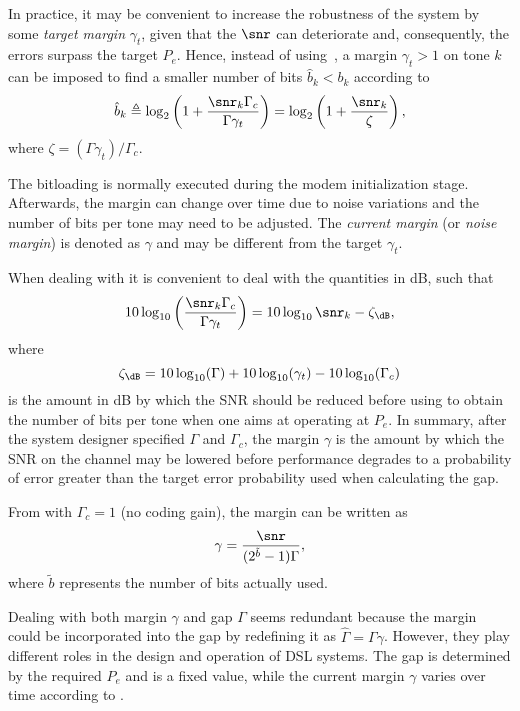 In practice, it may be convenient to increase the robustness of the system by some \emph{target margin} $\gamma_t$, given that the $\snr$ can deteriorate and, consequently, the errors surpass the target $P_e$. Hence, instead of using~, a margin $\gamma_t > 1$  on tone $k$ can be imposed to find a smaller number of bits $\hat b_k < b_k$ according to
\begin{equation}
\label{eq:margin}
\hat b_k \triangleq \log_2 \left(1 + \frac{\snr_k \Gamma_c}{\Gamma \gamma_t}\right) = \log_2 \left(1 + \frac{\snr_k }{\zeta}\right),
\end{equation}
where $\zeta = (\Gamma \gamma_t)/\Gamma_c$.

The bitloading is normally executed during the modem initialization stage. Afterwards, the margin can change over time due to noise variations and the number of bits per tone may need to be adjusted. The \emph{current margin} (or \emph{noise margin}) is denoted as $\gamma$ and may be different from the target $\gamma_t$.

When dealing with  it is convenient to deal with the quantities in dB, such that
\[
10 \log_{10} \left( \frac{\snr_k \Gamma_c}{\Gamma \gamma_t} \right) = 10 \log_{10} \snr_k - \zeta_{\dB},
\]
where
\[
\zeta_{\dB} = 10 \log_{10} (\Gamma) + 10 \log_{10} (\gamma_t) - 10 \log_{10} (\Gamma_c)
\]
is the amount in dB by which the SNR should be reduced before using  to obtain the number of bits per tone when one aims at operating at $P_e$. In summary, after the system designer specified $\Gamma$ and $\Gamma_c$, the margin $\gamma$ is the amount by which the SNR on the channel may be lowered before performance degrades
to a probability of error greater than the target error probability used when calculating the gap. 


From  with $\Gamma_c = 1$ (no coding gain), the margin can be written as
\begin{equation}
\gamma = \frac{\snr}{(2^{\tilde b} - 1) \Gamma},
\label{eq:margin_explicit}
\end{equation}
where $\tilde b$ represents the number of bits actually used.

Dealing with both margin $\gamma$ and gap $\Gamma$ seems redundant because the margin could be incorporated into the gap by redefining it as $\hat \Gamma = \Gamma \gamma$. However, they play different roles in the design and operation of DSL systems. The gap is determined by the required $P_e$ and is a fixed value, while the current margin $\gamma$ varies over time according to .

